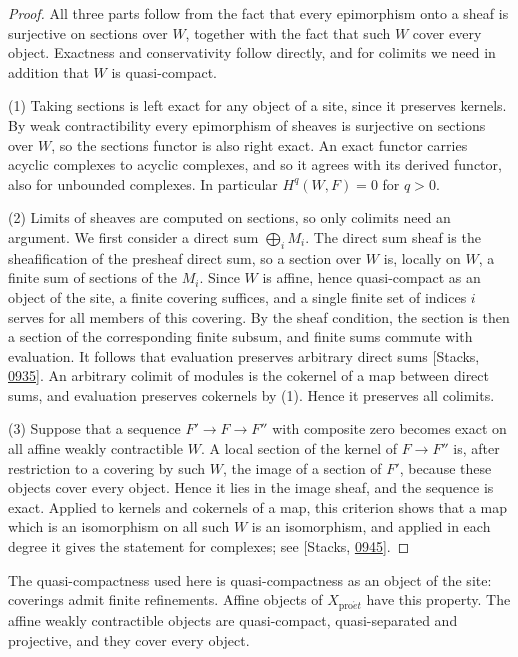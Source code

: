 \documentclass[11pt]{article}
\begin{document}
\begin{proof}[{Proof}]\label{bp60}%
All three parts follow from the fact that every epimorphism onto a sheaf is surjective on sections over \(W\), together with the fact that such \(W\) cover every object. Exactness and conservativity follow directly, and for colimits we need in addition that \(W\) is quasi-compact.

(1) Taking sections is left exact for any object of a site, since it preserves kernels. By weak contractibility every epimorphism of sheaves is surjective on sections over \(W\), so the sections functor is also right exact. An exact functor carries acyclic complexes to acyclic complexes, and so it agrees with its derived functor, also for unbounded complexes. In particular \(H^q(W,F)=0\) for \(q>0\).

(2) Limits of sheaves are computed on sections, so only colimits need an argument. We first consider a direct sum \(\bigoplus_iM_i\). The direct sum sheaf is the sheafification of the presheaf direct sum, so a section over \(W\) is, locally on \(W\), a finite sum of sections of the \(M_i\). Since \(W\) is affine, hence quasi-compact as an object of the site, a finite covering suffices, and a single finite set of indices \(i\) serves for all members of this covering. By the sheaf condition, the section is then a section of the corresponding finite subsum, and finite sums commute with evaluation. It follows that evaluation preserves arbitrary direct sums [Stacks, \href{https://stacks.math.columbia.edu/tag/0935}{0935}]. An arbitrary colimit of modules is the cokernel of a map between direct sums, and evaluation preserves cokernels by (1). Hence it preserves all colimits.

(3) Suppose that a sequence \(F'\to F\to F''\) with composite zero becomes exact on all affine weakly contractible \(W\). A local section of the kernel of \(F\to F''\) is, after restriction to a covering by such \(W\), the image of a section of \(F'\), because these objects cover every object. Hence it lies in the image sheaf, and the sequence is exact. Applied to kernels and cokernels of a map, this criterion shows that a map which is an isomorphism on all such \(W\) is an isomorphism, and applied in each degree it gives the statement for complexes; see [Stacks, \href{https://stacks.math.columbia.edu/tag/0945}{0945}].
\end{proof}

\label{bp61}%
The quasi-compactness used here is quasi-compactness as an object of the site: coverings admit finite refinements. Affine objects of \(X_{\mathrm{pro}\acute{e}t}\) have this property. The affine weakly contractible objects are quasi-compact, quasi-separated and projective, and they cover every object.
\end{document}
